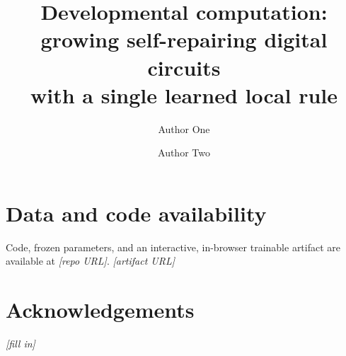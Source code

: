 \documentclass[11pt]{article}
\title{\textbf{Developmental computation: growing self-repairing digital circuits\\
with a single learned local rule}}
\author[1]{Author One}
\author[1]{Author Two}
\affil[1]{Affiliation \note{(fill in)}}
\date{}
\newcommand{\note}[1]{{\color{blue!60!black}\textit{#1}}}
\begin{document}
\maketitle

\begin{abstract}

\end{abstract}






\clearpage


\section*{Data and code availability}
Code, frozen parameters, and an interactive, in-browser trainable artifact are available at
\note{[repo URL]}. \note{[artifact URL]}

\section*{Acknowledgements}
\note{[fill in]}



\end{document}
